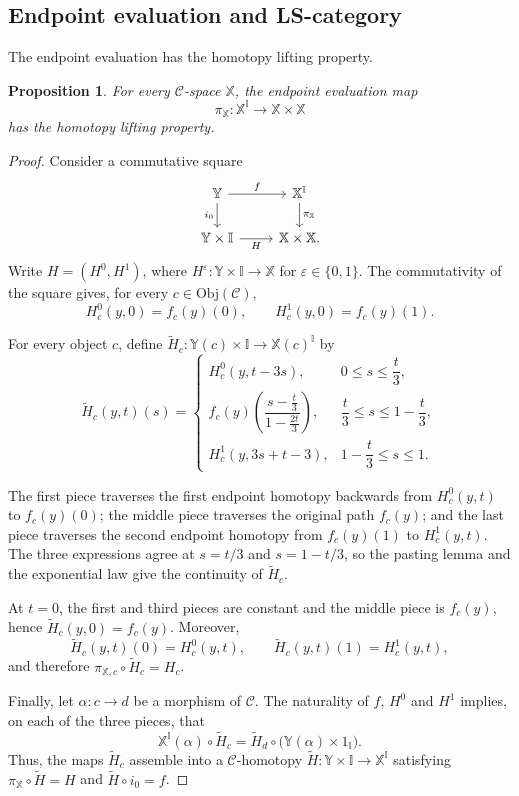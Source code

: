 \documentclass[12pt]{amsart}
\newtheorem{prop}[teo]{Proposition}
\theoremstyle{definition}
\theoremstyle{remark}
\numberwithin{figure}{section}%
\newcommand{\CC}{\mathcal{C}}
\newcommand{\X}{\mathbb{X}}
\newcommand{\Y}{\mathbb{Y}}
\newcommand{\Obj}{\mathrm{Obj}}
\begin{document}
\subsection{Endpoint evaluation and LS-category}

The endpoint evaluation has the homotopy lifting property.

\begin{prop}\label{prop:path-fibration-HLP}
For every $\CC$-space $\X$, the endpoint evaluation map
\[
\pi_{\X}\colon\X^{\mathbb I}\longrightarrow\X\times\X
\]
has the homotopy lifting property.
\end{prop}

\begin{proof}
Consider a commutative square
\[
\begin{tikzcd}
\Y
  \arrow[r,"f"]
  \arrow[d,"i_0"']
&
\X^{\mathbb I}
  \arrow[d,"\pi_{\X}"]
\\
\Y\times\mathbb I
  \arrow[r,"H"']
&
\X\times\X.
\end{tikzcd}
\]
Write $H=(H^0,H^1)$, where
$H^\varepsilon\colon\Y\times\mathbb I\to\X$ for
$\varepsilon\in\{0,1\}$. The commutativity of the square gives, for
every $c\in\Obj(\CC)$,
\[
H^0_c(y,0)=f_c(y)(0),
\qquad
H^1_c(y,0)=f_c(y)(1).
\]

For every object $c$, define
$\widetilde H_c\colon\Y(c)\times\mathbb I\to\X(c)^{\mathbb I}$ by
\[
\widetilde H_c(y,t)(s)=
\begin{cases}
H^0_c(y,t-3s),
    & 0\leq s\leq \dfrac{t}{3},\\[2mm]
f_c(y)\left(
\dfrac{s-\frac{t}{3}}{1-\frac{2t}{3}}
\right),
    & \dfrac{t}{3}\leq s\leq1-\dfrac{t}{3},\\[4mm]
H^1_c(y,3s+t-3),
    & 1-\dfrac{t}{3}\leq s\leq1.
\end{cases}
\]

The first piece traverses the first endpoint homotopy backwards from
$H^0_c(y,t)$ to $f_c(y)(0)$; the middle piece traverses the original
path $f_c(y)$; and the last piece traverses the second endpoint
homotopy from $f_c(y)(1)$ to $H^1_c(y,t)$. The three expressions agree
at $s=t/3$ and $s=1-t/3$, so the pasting lemma and the exponential law
give the continuity of $\widetilde H_c$.

At $t=0$, the first and third pieces are constant and the middle piece
is $f_c(y)$, hence
$\widetilde H_c(y,0)=f_c(y)$. Moreover,
\[
\widetilde H_c(y,t)(0)=H^0_c(y,t),
\qquad
\widetilde H_c(y,t)(1)=H^1_c(y,t),
\]
and therefore $\pi_{\X,c}\circ\widetilde H_c=H_c$.

Finally, let $\alpha\colon c\to d$ be a morphism of $\CC$. The
naturality of $f$, $H^0$ and $H^1$ implies, on each of the three pieces,
that
\[
\X^{\mathbb I}(\alpha)\circ\widetilde H_c
=
\widetilde H_d\circ
\bigl(\Y(\alpha)\times1_{\mathbb I}\bigr).
\]
Thus, the maps $\widetilde H_c$ assemble into a $\CC$-homotopy
$\widetilde H\colon\Y\times\mathbb I\to\X^{\mathbb I}$ satisfying
$\pi_{\X}\circ\widetilde H=H$ and
$\widetilde H\circ i_0=f$.
\end{proof}
\end{document}
